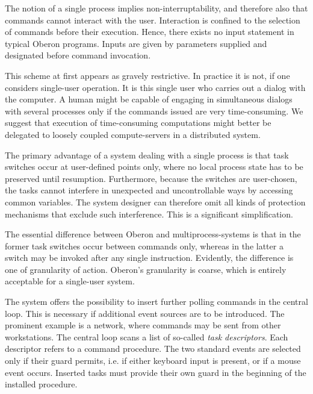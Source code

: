 The notion of a single process implies non-interruptability, and
therefore also that commands cannot interact with the
user. Interaction is confined to the selection of commands before
their execution. Hence, there exists no input statement in typical
Oberon programs. Inputs are given by parameters supplied and
designated before command invocation.

This scheme at first appears as gravely restrictive. In practice it is
not, if one considers single-user operation. It is this single user
who carries out a dialog with the computer. A human might be capable
of engaging in simultaneous dialogs with several processes only if the
commands issued are very time-consuming. We suggest that execution of
time-consuming computations might better be delegated to loosely
coupled compute-servers in a distributed system.

The primary advantage of a system dealing with a single process is
that task switches occur at user-defined points only, where no local
process state has to be preserved until resumption. Furthermore,
because the switches are user-chosen, the tasks cannot interfere in
unexpected and uncontrollable ways by accessing common variables. The
system designer can therefore omit all kinds of protection mechanisms
that exclude such interference. This is a significant simplification.

The essential difference between Oberon and multiprocess-systems is
that in the former task switches occur between commands only, whereas
in the latter a switch may be invoked after any single
instruction. Evidently, the difference is one of granularity of
action. Oberon's granularity is coarse, which is entirely acceptable
for a single-user system.

The system offers the possibility to insert further polling commands
in the central loop. This is necessary if additional event sources are
to be introduced. The prominent example is a network, where commands
may be sent from other workstations. The central loop scans a list of
so-called {\it task descriptors\/}. Each descriptor refers to a command
procedure. The two standard events are selected only if their guard
permits, i.e. if either keyboard input is present, or if a mouse event
occurs. Inserted tasks must provide their own guard in the beginning
of the installed procedure.

